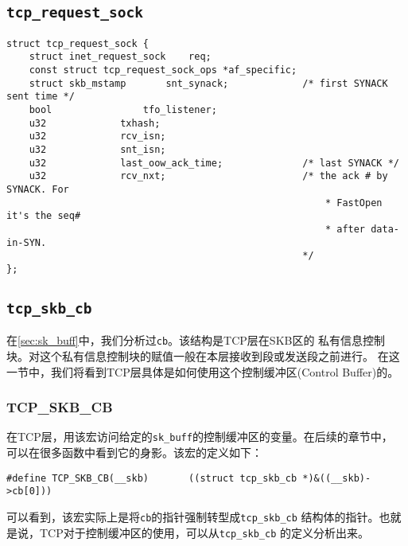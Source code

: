         \subsection{\texttt{tcp_request_sock}}
\begin{verbatim}
struct tcp_request_sock {
    struct inet_request_sock    req;
    const struct tcp_request_sock_ops *af_specific;
    struct skb_mstamp       snt_synack;             /* first SYNACK sent time */
    bool                tfo_listener;
    u32             txhash;
    u32             rcv_isn;
    u32             snt_isn;
    u32             last_oow_ack_time;              /* last SYNACK */
    u32             rcv_nxt;                        /* the ack # by SYNACK. For
                                                        * FastOpen it's the seq#
                                                        * after data-in-SYN.
                                                    */
};
\end{verbatim}
        \subsection{\texttt{tcp_skb_cb}}
            \label{sec:tcp_skb_cb}

            在\ref{sec:sk_buff}中，我们分析过\texttt{cb}。该结构是TCP层在SKB区的
            私有信息控制块。对这个私有信息控制块的赋值一般在本层接收到段或发送段之前进行。
            在这一节中，我们将看到TCP层具体是如何使用这个控制缓冲区(Control Buffer)的。

            \subsubsection{TCP\_SKB\_CB}
                \label{subsec:tcp_skb_cb}

            在TCP层，用该宏访问给定的\texttt{sk_buff}的控制缓冲区的变量。在后续的章节中，
            可以在很多函数中看到它的身影。该宏的定义如下：

\begin{verbatim}
#define TCP_SKB_CB(__skb)       ((struct tcp_skb_cb *)&((__skb)->cb[0]))
\end{verbatim}

            可以看到，该宏实际上是将\texttt{cb}的指针强制转型成\texttt{tcp_skb_cb}
            结构体的指针。也就是说，TCP对于控制缓冲区的使用，可以从\texttt{tcp_skb_cb}
            的定义分析出来。

